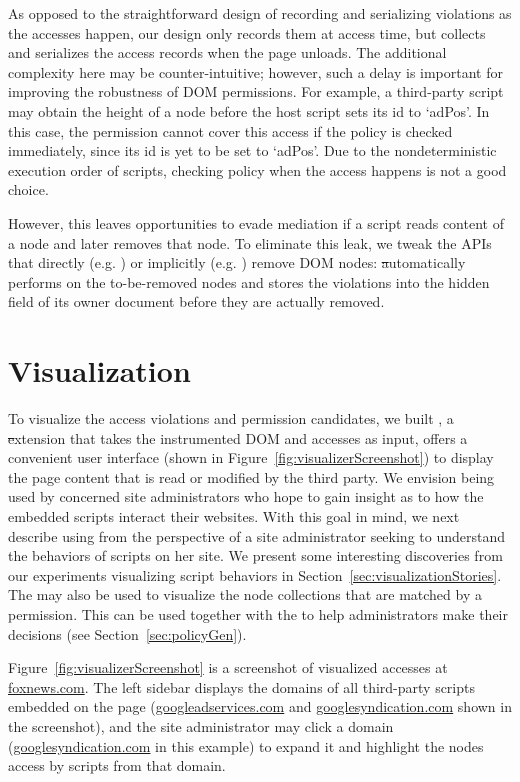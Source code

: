 As opposed to the straightforward design of recording and serializing violations as the accesses happen, our design only records them at access time, but collects and serializes the access records when the page unloads.  The additional complexity here may be counter-intuitive; however, such a delay is important for improving the robustness of DOM permissions.  For example, a third-party script may obtain the height of a node before the host script sets its id to `adPos'.  In this case, the permission  cannot cover this access if the policy is checked immediately, since its id is yet to be set to `adPos'.  Due to the nondeterministic execution order of scripts, checking policy when the access happens is not a good choice.

However, this leaves opportunities to evade mediation if a script reads content of a node and later removes that node.  To eliminate this leak, we tweak the APIs that directly (e.g. ) or implicitly (e.g. ) remove DOM nodes: \st automatically performs  on the to-be-removed nodes and stores the violations into the hidden field of its owner document before they are actually removed.

\section{Visualization}
\label{sec:visualization}

To visualize the access violations and permission candidates, we built
\vis, a \st extension that takes the instrumented DOM and accesses as
input, offers a convenient user interface (shown in
Figure~\ref{fig:visualizerScreenshot}) to display the page content that
is read or modified by the third party.  We envision \vis being used by
concerned site administrators who hope to gain insight as to how the
embedded scripts interact their websites.  With this goal in mind, we
next describe using \vis from the perspective of a site administrator
seeking to understand the behaviors of scripts on her site.  We present
some interesting discoveries from our experiments visualizing script
behaviors in Section~\ref{sec:visualizationStories}.  The \vis may also
be used to visualize the node collections that are matched by a
permission.  This can be used together with the \pg to help
administrators make their decisions (see Section~\ref{sec:policyGen}).

Figure~\ref{fig:visualizerScreenshot} is a screenshot of visualized accesses at \url{foxnews.com}.  The left sidebar displays the domains of all 
third-party scripts embedded on the page (\url{googleadservices.com} and
\url{googlesyndication.com} shown in the screenshot), and the site administrator
may click a domain (\url{googlesyndication.com} in this
example) to expand it and highlight the nodes access by scripts from that domain.

